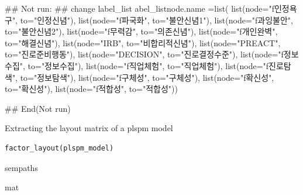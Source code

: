 \documentclass[a4paper]{book}
\begin{document}
%
\begin{Examples}
\begin{ExampleCode}

## Not run: 
## change label_list
abel_listnode.name =list(
  list(node="f인정욕구", to="인정신념"),
  list(node="f파국화",  to="불안신념1"),
  list(node="f과잉불안", to="불안신념2"),
  list(node="f무력감",  to="의존신념"),
  list(node="f개인완벽", to="해결신념"),
  list(node="IRB",  to="비합리적신념"),
  list(node="PREACT",  to="진로준비행동"),
  list(node="DECISION",  to="진로결정수준"),
  list(node="f정보수집",  to="정보수집"),
  list(node="f직업체험",  to="직업체험"),
  list(node="f진로탐색",  to="정보탐색"),
  list(node="f구체성",  to="구체성"),
  list(node="f확신성",  to="확신성"),
  list(node="f적합성",  to="적합성"))

## End(Not run)


\end{ExampleCode}
\end{Examples}
%
\begin{Description}
Extracting the layout matrix of a plspm model
\end{Description}
%
\begin{Usage}
\begin{verbatim}
factor_layout(plspm_model)
\end{verbatim}
\end{Usage}
%
\begin{Arguments}
\begin{ldescription}
\item[\code{plspm\_model}] sempaths
\end{ldescription}
\end{Arguments}
%
\begin{Value}
mat
\end{Value}
%
\end{document}
